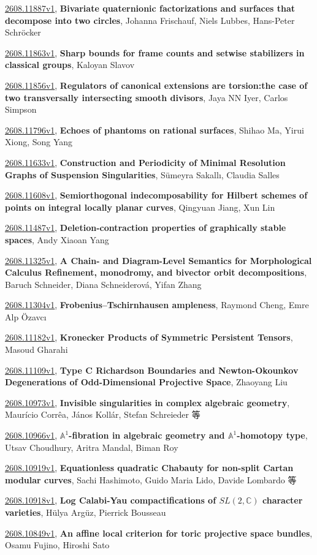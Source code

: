\documentclass[9pt, a4paper]{article}
\theoremstyle{plain}
\theoremstyle{definition}
\theoremstyle{remark}
\newcommand{\arxiv}[3]{\href{https://arxiv.org/abs/#1}{#1}, \textbf{\textcolor{arxivblue}{#2}}, #3}
\begin{document}
\arxiv{2608.11887v1}{Bivariate quaternionic factorizations and surfaces that decompose into two circles}{Johanna Frischauf, Niels Lubbes, Hans-Peter Schröcker}

\arxiv{2608.11863v1}{Sharp bounds for frame counts and setwise stabilizers in classical groups}{Kaloyan Slavov}

\arxiv{2608.11856v1}{Regulators of canonical extensions are torsion:the case of two transversally intersecting smooth divisors}{Jaya NN Iyer, Carlos Simpson}

\arxiv{2608.11796v1}{Echoes of phantoms on rational surfaces}{Shihao Ma, Yirui Xiong, Song Yang}

\arxiv{2608.11633v1}{Construction and Periodicity of Minimal Resolution Graphs of Suspension Singularities}{Sümeyra Sakallı, Claudia Salles}

\arxiv{2608.11608v1}{Semiorthogonal indecomposability for Hilbert schemes of points on integral locally planar curves}{Qingyuan Jiang, Xun Lin}

\arxiv{2608.11487v1}{Deletion-contraction properties of graphically stable spaces}{Andy Xiaoan Yang}

\arxiv{2608.11325v1}{A Chain- and Diagram-Level Semantics for Morphological Calculus Refinement, monodromy, and bivector orbit decompositions}{Baruch Schneider, Diana Schneiderová, Yifan Zhang}

\arxiv{2608.11304v1}{Frobenius--Tschirnhausen ampleness}{Raymond Cheng, Emre Alp Özavcı}

\arxiv{2608.11182v1}{Kronecker Products of Symmetric Persistent Tensors}{Masoud Gharahi}

\arxiv{2608.11109v1}{Type C Richardson Boundaries and Newton-Okounkov Degenerations of Odd-Dimensional Projective Space}{Zhaoyang Liu}

\arxiv{2608.10973v1}{Invisible singularities in complex algebraic geometry}{Maurício Corrêa, János Kollár, Stefan Schreieder 等}

\arxiv{2608.10966v1}{$\mathbb{A}^1$-fibration in algebraic geometry and $\mathbb{A}^1$-homotopy type}{Utsav Choudhury, Aritra Mandal, Biman Roy}

\arxiv{2608.10919v1}{Equationless quadratic Chabauty for non-split Cartan modular curves}{Sachi Hashimoto, Guido Maria Lido, Davide Lombardo 等}

\arxiv{2608.10918v1}{Log Calabi-Yau compactifications of $SL(2,\mathbb{C})$ character varieties}{Hülya Argüz, Pierrick Bousseau}

\arxiv{2608.10849v1}{An affine local criterion for toric projective space bundles}{Osamu Fujino, Hiroshi Sato}
\end{document}
